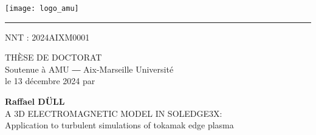 \chead{}
\thispagestyle{empty}

\vspace{1em}

\begin{center}
	\begin{minipage}[c]{.5\linewidth}
		\raggedright\texttt{[image: logo\_amu]}
	\end{minipage}\hfill
	\begin{minipage}[c]{.5\linewidth}
	\end{minipage}\hfill
\end{center}


\begin{center}
	\begin{minipage}[c]{.77\linewidth}
		\textcolor{yellowamu}{\noindent\rule{\textwidth}{4pt}}
	\end{minipage}\hfill
	\begin{minipage}[c]{.23\linewidth}
		\raggedleft\textsf{NNT : 2024AIXM0001}
	\end{minipage}\hfill
\end{center}


\doublespacing
\begin{flushleft}
    \textsf{\HUGE\textcolor{blueamu}{THÈSE DE DOCTORAT}}\\
	\textsf{\Large Soutenue à AMU ― Aix-Marseille Université}\\
	\textsf{\Large le 13 décembre 2024 par}\\
\end{flushleft}
\vspace{1.5em}
\begin{center}
	\textsf{\textbf{\Huge Raffael DÜLL}}\\
    \vspace{1em}
	\textsf{\LARGE A 3D ELECTROMAGNETIC MODEL IN SOLEDGE3X:}\\ 
	\textsf{\Large Application to turbulent simulations of tokamak edge plasma}\\
\end{center}
\singlespacing

